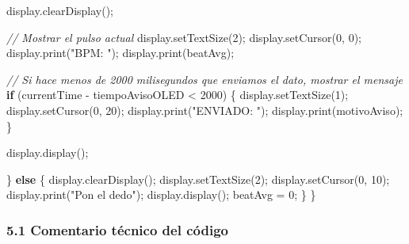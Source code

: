 \documentclass[11pt]{article}
\newenvironment{Shaded}{}{}
\newcommand{\DecValTok}[1]{\textcolor[rgb]{0.25,0.63,0.44}{{#1}}}
\newcommand{\StringTok}[1]{\textcolor[rgb]{0.25,0.44,0.63}{{#1}}}
\newcommand{\CommentTok}[1]{\textcolor[rgb]{0.38,0.63,0.69}{\textit{{#1}}}}
\newcommand{\NormalTok}[1]{{#1}}
\newcommand{\ControlFlowTok}[1]{\textcolor[rgb]{0.00,0.44,0.13}{\textbf{{#1}}}}
\newcommand{\OperatorTok}[1]{\textcolor[rgb]{0.40,0.40,0.40}{{#1}}}
\begin{document}
\begin{Shaded}
\begin{Highlighting}[]
\NormalTok{    display}\OperatorTok{.}\NormalTok{clearDisplay}\OperatorTok{();}

    \CommentTok{// Mostrar el pulso actual}
\NormalTok{    display}\OperatorTok{.}\NormalTok{setTextSize}\OperatorTok{(}\DecValTok{2}\OperatorTok{);}
\NormalTok{    display}\OperatorTok{.}\NormalTok{setCursor}\OperatorTok{(}\DecValTok{0}\OperatorTok{,} \DecValTok{0}\OperatorTok{);}
\NormalTok{    display}\OperatorTok{.}\NormalTok{print}\OperatorTok{(}\StringTok{"BPM: "}\OperatorTok{);}\NormalTok{ display}\OperatorTok{.}\NormalTok{print}\OperatorTok{(}\NormalTok{beatAvg}\OperatorTok{);}

    \CommentTok{// Si hace menos de 2000 milisegundos que enviamos el dato, mostrar el mensaje}
    \ControlFlowTok{if} \OperatorTok{(}\NormalTok{currentTime }\OperatorTok{{-}}\NormalTok{ tiempoAvisoOLED }\OperatorTok{\textless{}} \DecValTok{2000}\OperatorTok{)} \OperatorTok{\{}
\NormalTok{      display}\OperatorTok{.}\NormalTok{setTextSize}\OperatorTok{(}\DecValTok{1}\OperatorTok{);}
\NormalTok{      display}\OperatorTok{.}\NormalTok{setCursor}\OperatorTok{(}\DecValTok{0}\OperatorTok{,} \DecValTok{20}\OperatorTok{);}
\NormalTok{      display}\OperatorTok{.}\NormalTok{print}\OperatorTok{(}\StringTok{"ENVIADO: "}\OperatorTok{);}
\NormalTok{      display}\OperatorTok{.}\NormalTok{print}\OperatorTok{(}\NormalTok{motivoAviso}\OperatorTok{);}
    \OperatorTok{\}}

\NormalTok{    display}\OperatorTok{.}\NormalTok{display}\OperatorTok{();}

  \OperatorTok{\}} \ControlFlowTok{else} \OperatorTok{\{}
\NormalTok{    display}\OperatorTok{.}\NormalTok{clearDisplay}\OperatorTok{();}
\NormalTok{    display}\OperatorTok{.}\NormalTok{setTextSize}\OperatorTok{(}\DecValTok{2}\OperatorTok{);}
\NormalTok{    display}\OperatorTok{.}\NormalTok{setCursor}\OperatorTok{(}\DecValTok{0}\OperatorTok{,} \DecValTok{10}\OperatorTok{);}
\NormalTok{    display}\OperatorTok{.}\NormalTok{print}\OperatorTok{(}\StringTok{"Pon el dedo"}\OperatorTok{);}
\NormalTok{    display}\OperatorTok{.}\NormalTok{display}\OperatorTok{();}
\NormalTok{    beatAvg }\OperatorTok{=} \DecValTok{0}\OperatorTok{;}
  \OperatorTok{\}}
\OperatorTok{\}}
\end{Highlighting}
\end{Shaded}

\subsubsection{5.1 Comentario técnico del
código}\label{comentario-tuxe9cnico-del-cuxf3digo}
\end{document}
